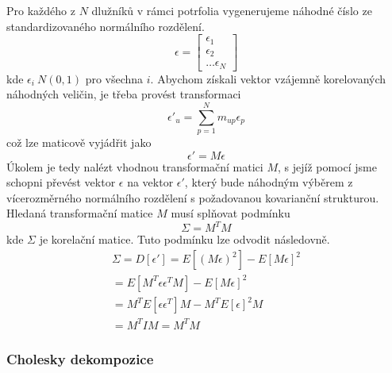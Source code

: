 Pro každého z $N$ dlužníků v rámci potrfolia vygenerujeme náhodné číslo ze standardizovaného normálního rozdělení.
\begin{equation}
\epsilon =
\begin{bmatrix}
\epsilon_1\\
\epsilon_2\\
\hdots
\epsilon_N
\end{bmatrix}
\end{equation}
kde $\epsilon_i ~ N(0, 1)$ pro všechna $i$. Abychom získali vektor vzájemně korelovaných náhodných veličin, je třeba provést transformaci
\begin{equation*}
\epsilon'_u = \sum_{p = 1}^N m_{up}\epsilon_p
\end{equation*}
což lze maticově vyjádřit jako
\begin{equation}
\epsilon' = M \epsilon
\end{equation}
Úkolem je tedy nalézt vhodnou transformační matici $M$, s jejíž pomocí jsme schopni převést vektor $\epsilon$ na vektor $\epsilon'$, který bude náhodným výběrem z vícerozměrného normálního rozdělení s požadovanou kovarianční strukturou. Hledaná transformační matice $M$ musí splňovat podmínku
\begin{equation}
\Sigma = M^T M
\end{equation}
kde $\Sigma$ je korelační matice. Tuto podmínku lze odvodit následovně.
\begin{multline}
\Sigma = D[\epsilon'] = E[(M\epsilon)^2] - E[M\epsilon]^2\\
= E[M^T \epsilon \epsilon^T M] - E[M \epsilon]^2\\
= M^TE[\epsilon \epsilon^T] M - M^T E[\epsilon]^2 M\\
= M^T I M = M^TM
\end{multline}

\subsubsection{Cholesky dekompozice}

